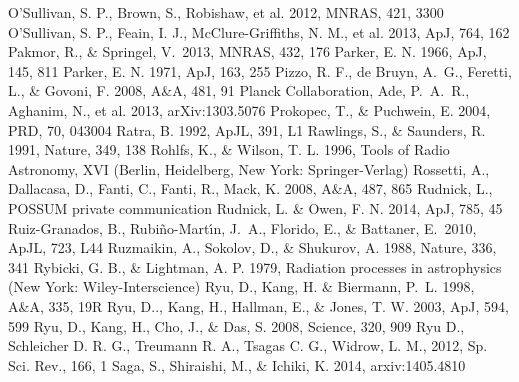 \begin{thebibliography}{99}
\begin{multicols}{2}
{	O'Sullivan, S. P., Brown, S., Robishaw, et al. 2012, MNRAS, 421, 3300
	O’Sullivan, S. P., Feain, I. J., McClure-Griffiths, N. M., et al.  2013, ApJ, 764, 162
	Pakmor, R., \& Springel, V.\ 2013, MNRAS, 432, 176 
	Parker, E. N. 1966, ApJ, 145, 811
	Parker, E. N. 1971, ApJ, 163, 255
	Pizzo, R. F., de Bruyn, A.~G., Feretti, L., \& Govoni, F. 2008, A\&A, 481, 91
	Planck Collaboration, Ade, P.~A.~R., Aghanim, N., et al. 2013, arXiv:1303.5076
	Prokopec, T., \& Puchwein, E. 2004, PRD, 70, 043004
	Ratra, B. 1992, ApJL, 391, L1
	Rawlings, S., \& Saunders, R. 1991, Nature, 349, 138
	Rohlfs, K., \& Wilson, T. L. 1996, Tools of Radio Astronomy, XVI (Berlin, Heidelberg, New York: Springer-Verlag)
	Rossetti, A., Dallacasa, D., Fanti, C., Fanti, R., Mack, K. 2008, A\&A, 487, 865
	Rudnick, L., POSSUM private communication
	Rudnick, L. \& Owen, F. N. 2014, ApJ, 785, 45
	Ruiz-Granados, B., Rubi{\~n}o-Mart{\'{\i}}n, J.~A., Florido, E., \& Battaner, E.\ 2010, ApJL, 723, L44 
	Ruzmaikin, A., Sokolov, D., \& Shukurov, A. 1988, Nature, 336, 341
	Rybicki, G. B., \& Lightman, A. P. 1979, Radiation processes in astrophysics (New York: Wiley-Interscience)
	Ryu, D., Kang, H. \& Biermann, P.~L. 1998, A\&A, 335, 19R
	Ryu, D.., Kang, H., Hallman, E., \& Jones, T. W. 2003, ApJ, 594, 599
	Ryu, D., Kang, H., Cho, J., \& Das, S. 2008, Science, 320, 909
	Ryu D., Schleicher D. R. G., Treumann R. A., Tsagas C. G., Widrow, L. M., 2012, Sp. Sci. Rev., 166, 1
	Saga, S., Shiraishi, M., \& Ichiki, K. 2014, arxiv:1405.4810
}
\end{multicols}
\end{thebibliography}
